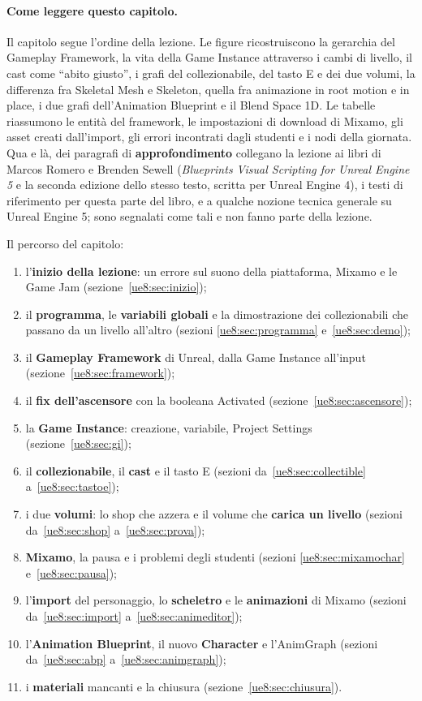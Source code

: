 \paragraph{Come leggere questo capitolo.} Il capitolo segue l'ordine della lezione. Le
figure ricostruiscono la gerarchia del Gameplay Framework, la vita della Game Instance
attraverso i cambi di livello, il cast come ``abito giusto'', i grafi del collezionabile,
del tasto E e dei due volumi, la differenza fra Skeletal Mesh e Skeleton, quella fra
animazione in root motion e in place, i due grafi dell'Animation Blueprint e il Blend
Space 1D. Le tabelle riassumono le entità del framework, le impostazioni di download di
Mixamo, gli asset creati dall'import, gli errori incontrati dagli studenti e i nodi della
giornata. Qua e là, dei paragrafi di \textbf{approfondimento} collegano la lezione ai
libri di Marcos Romero e Brenden Sewell (\emph{Blueprints Visual Scripting for Unreal
Engine 5} e la seconda edizione dello stesso testo, scritta per Unreal Engine 4), i
testi di riferimento per questa parte del libro, e a qualche nozione tecnica generale su
Unreal Engine 5; sono segnalati come tali e non fanno parte della lezione.

Il percorso del capitolo:
\begin{enumerate}
  \item l'\textbf{inizio della lezione}: un errore sul suono della piattaforma, Mixamo e
        le Game Jam (sezione~\ref{ue8:sec:inizio});
  \item il \textbf{programma}, le \textbf{variabili globali} e la dimostrazione dei
        collezionabili che passano da un livello all'altro (sezioni
        \ref{ue8:sec:programma} e~\ref{ue8:sec:demo});
  \item il \textbf{Gameplay Framework} di Unreal, dalla Game Instance all'input
        (sezione~\ref{ue8:sec:framework});
  \item il \textbf{fix dell'ascensore} con la booleana Activated
        (sezione~\ref{ue8:sec:ascensore});
  \item la \textbf{Game Instance}: creazione, variabile, Project Settings
        (sezione~\ref{ue8:sec:gi});
  \item il \textbf{collezionabile}, il \textbf{cast} e il tasto E (sezioni
        da~\ref{ue8:sec:collectible} a~\ref{ue8:sec:tastoe});
  \item i due \textbf{volumi}: lo shop che azzera e il volume che \textbf{carica un
        livello} (sezioni da~\ref{ue8:sec:shop} a~\ref{ue8:sec:prova});
  \item \textbf{Mixamo}, la pausa e i problemi degli studenti (sezioni
        \ref{ue8:sec:mixamochar} e~\ref{ue8:sec:pausa});
  \item l'\textbf{import} del personaggio, lo \textbf{scheletro} e le
        \textbf{animazioni} di Mixamo (sezioni da~\ref{ue8:sec:import}
        a~\ref{ue8:sec:animeditor});
  \item l'\textbf{Animation Blueprint}, il nuovo \textbf{Character} e l'AnimGraph
        (sezioni da~\ref{ue8:sec:abp} a~\ref{ue8:sec:animgraph});
  \item i \textbf{materiali} mancanti e la chiusura (sezione~\ref{ue8:sec:chiusura}).
\end{enumerate}

